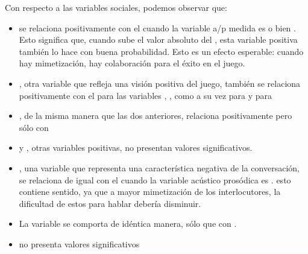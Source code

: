 Con respecto a las variables sociales, podemos observar que:

\begin{itemize}
  \item \svcontributes se relaciona positivamente con el \absentrainment cuando la variable a/p medida es \FOMEAN o bien \NOISETOHARMONICS. Esto significa que, cuando sube el valor absoluto del \entrainment, esta variable positiva también lo hace con buena probabilidad. Esto es un efecto esperable: cuando hay mimetización, hay colaboración para el éxito en el juego.
  \item \svclear, otra variable que refleja una visión positiva del juego, también se relaciona positivamente con el \absentrainment para las variables \FOMEAN, \NOISETOHARMONICS, \ENGMAX como a su vez para \PHONAVG y para \SYLCOUNT
  \item \svengaged, de la misma manera que las dos anteriores, relaciona positivamente pero sólo con \FOMEAN
  \item \svplanning y \svencourages, otras variables positivas, no presentan valores significativos.
  \item \svdifficult, una variable que representa una característica negativa de la conversación, se relaciona de igual con el \absentrainment cuando la variable acústico prosódica es \ENGMAX. esto contiene sentido, ya que a mayor mimetización de los interlocutores, la dificultad de estos para hablar debería disminuir.
  \item La variable \svbored se comporta de idéntica manera, sólo que con \FOMEAN.
  \item \svdislikes no presenta valores significativos
\end{itemize}



